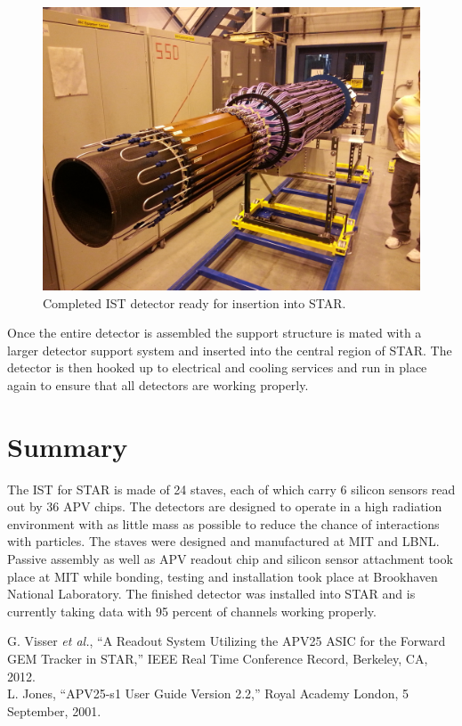 \documentclass[preprint,12pt]{elsarticle}
\begin{document}
\begin{figure}
\begin{center}
\includegraphics[width=5in, keepaspectratio=true, angle=0]{graphics/full.jpg}
\caption{Completed IST detector ready for insertion into STAR.
\label{fig:full}}
\end{center}
\end{figure}
%
Once the entire detector is assembled the support structure is mated with a
larger detector support system and inserted into the central region of STAR.
The detector is then hooked up to electrical and cooling services and run in
place again to ensure that all detectors are working properly.

\section{Summary}
The IST for STAR is made of 24 staves, each of which carry 6 silicon sensors read
out by 36 APV chips. The detectors are designed to operate in a high radiation
environment with as little mass as possible to reduce the chance of interactions
with particles. The staves were designed and manufactured at MIT and LBNL.
Passive assembly as well as APV readout chip and silicon sensor attachment took
place at MIT while bonding, testing and installation took place at Brookhaven
National Laboratory. The finished detector was installed into STAR and is
currently taking data with 95 percent of channels working properly.

\begin{thebibliography}{999}

G. Visser {\it et al.}, ``A Readout System Utilizing the APV25 ASIC for the
Forward GEM Tracker in STAR,'' IEEE Real Time Conference Record, Berkeley, CA,
2012. \\

L. Jones, ``APV25-s1 User Guide Version 2.2,'' Royal Academy London, 5
September, 2001. \\

\end{thebibliography}
\end{document}
